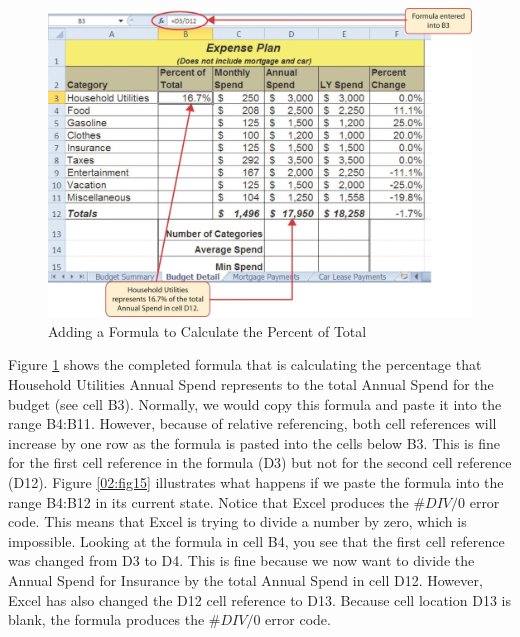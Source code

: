 \begin{figure}[H]
	\centering
	\includegraphics[width=\maxwidth{.95\linewidth}]{gfx/ch02_fig14}
	\caption{Adding a Formula to Calculate the Percent of Total}
	\label{02:fig14}
\end{figure}

Figure \ref{02:fig14} shows the completed formula that is calculating the percentage that Household Utilities Annual Spend represents to the total Annual Spend for the budget (see cell \textsf{B3}). Normally, we would copy this formula and paste it into the range \textsf{B4:B11}. However, because of relative referencing, both cell references will increase by one row as the formula is pasted into the cells below \textsf{B3}. This is fine for the first cell reference in the formula (\textsf{D3}) but not for the second cell reference (\textsf{D12}). Figure \ref{02:fig15} illustrates what happens if we paste the formula into the range \textsf{B4:B12} in its current state. Notice that Excel produces the $ \#DIV/0 $ error code. This means that Excel is trying to divide a number by zero, which is impossible. Looking at the formula in cell \textsf{B4}, you see that the first cell reference was changed from \textsf{D3} to \textsf{D4}. This is fine because we now want to divide the Annual Spend for Insurance by the total Annual Spend in cell \textsf{D12}. However, Excel has also changed the \textsf{D12} cell reference to \textsf{D13}. Because cell location \textsf{D13} is blank, the formula produces the $ \#DIV/0 $ error code.

